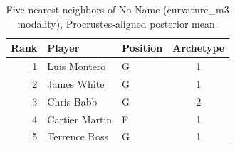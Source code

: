 \begin{table}[htbp]
  \centering\small
  \begin{tabular}{rllc}
    \toprule
    Rank & Player & Position & Archetype \\
    \midrule
    1 & Luis Montero & G & 1 \\
    2 & James White & G & 1 \\
    3 & Chris Babb & G & 2 \\
    4 & Cartier Martin & F & 1 \\
    5 & Terrence Ross & G & 1 \\
    \bottomrule
  \end{tabular}
  \caption{Five nearest neighbors of No Name (curvature_m3 modality), Procrustes-aligned posterior mean.}
  \label{tab:No_Name_neighbors_curvature_m3}
\end{table}

